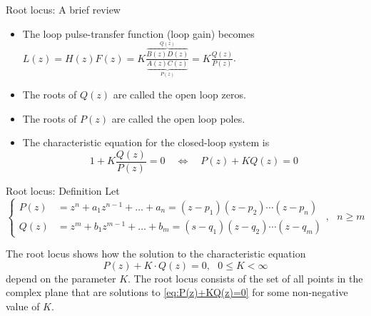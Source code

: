 \documentclass[presentation,aspectratio=169]{beamer}
\begin{document}
\begin{frame}[label={sec:org2d36761}]{Root locus: A brief review}
\begin{LaTeX}
\begin{center}
\end{center}
\end{LaTeX}

\begin{itemize}
\item The loop pulse-transfer function (loop gain) becomes \(L(z) = H(z)F(z) = K\frac{\overbrace{B(z)D(z)}^{Q(z)}}{\underbrace{A(z)C(z)}_{P(z)}} = K \frac{Q(z)}{P(z)}\).
\item The roots of \(Q(z)\) are called the \alert{open loop zeros}.
\item The roots of \(P(z)\) are called the \alert{open loop poles}.
\item The characteristic equation for the closed-loop system is \[ 1 + K\frac{Q(z)}{P(z)} = 0 \quad \Leftrightarrow \quad P(z) + KQ(z) = 0\]
\end{itemize}
\end{frame}


\begin{frame}[label={sec:org0e0a1d3}]{Root locus: Definition}
Let
\[\begin{cases} P(z)&=z^n+a_1z^{n-1}+\dots+a_n = (z-p_1)(z-p_2)\cdots(z-p_n)\\ 
Q(z)&=z^m+b_1 z^{m-1}+\dots+b_m=(s-q_1)(z-q_2)\cdots(z-q_m) \end{cases},\ \ \ n\ge m \]

The root locus shows how the \alert{solution} to the characteristic equation
\begin{equation}
\label{eq:P(z)+KQ(z)=0}
P(z)+K\cdot Q(z)=0,\ \ \ 0\le K<\infty
\end{equation}
depend on the parameter \(K\). The root locus consists of the set of all points in the complex plane that are solutions to \eqref{eq:P(z)+KQ(z)=0} for some non-negative value of \(K\).
\end{frame}
\end{document}
